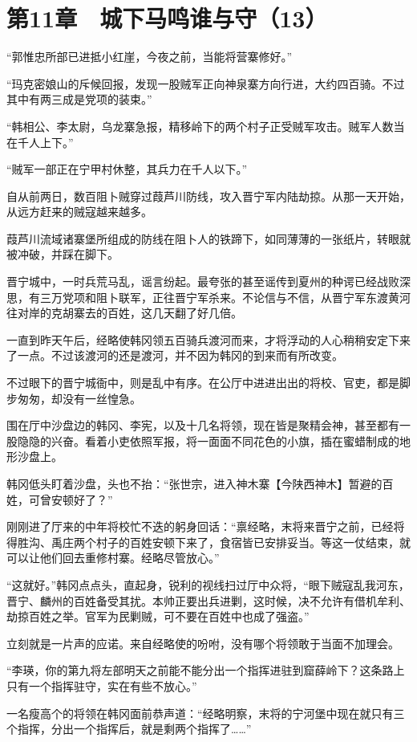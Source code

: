 \section{第11章　城下马鸣谁与守（13）}

“郭惟忠所部已进抵小红崖，今夜之前，当能将营寨修好。”

“玛克密娘山的斥候回报，发现一股贼军正向神泉寨方向行进，大约四百骑。不过其中有两三成是党项的装束。”

“韩相公、李太尉，乌龙寨急报，精移岭下的两个村子正受贼军攻击。贼军人数当在千人上下。”

“贼军一部正在宁甲村休整，其兵力在千人以下。”

自从前两日，数百阻卜贼穿过葭芦川防线，攻入晋宁军内陆劫掠。从那一天开始，从远方赶来的贼寇越来越多。

葭芦川流域诸寨堡所组成的防线在阻卜人的铁蹄下，如同薄薄的一张纸片，转眼就被冲破，并踩在脚下。

晋宁城中，一时兵荒马乱，谣言纷起。最夸张的甚至谣传到夏州的种谔已经战败深思，有三万党项和阻卜联军，正往晋宁军杀来。不论信与不信，从晋宁军东渡黄河往对岸的克胡寨去的百姓，这几天翻了好几倍。

一直到昨天午后，经略使韩冈领五百骑兵渡河而来，才将浮动的人心稍稍安定下来了一点。不过该渡河的还是渡河，并不因为韩冈的到来而有所改变。

不过眼下的晋宁城衙中，则是乱中有序。在公厅中进进出出的将校、官吏，都是脚步匆匆，却没有一丝惶急。

围在厅中沙盘边的韩冈、李宪，以及十几名将领，现在皆是聚精会神，甚至都有一股隐隐的兴奋。看着小吏依照军报，将一面面不同花色的小旗，插在蜜蜡制成的地形沙盘上。

韩冈低头盯着沙盘，头也不抬：“张世宗，进入神木寨【今陕西神木】暂避的百姓，可曾安顿好了？”

刚刚进了厅来的中年将校忙不迭的躬身回话：“禀经略，末将来晋宁之前，已经将得胜沟、禹庄两个村子的百姓安顿下来了，食宿皆已安排妥当。等这一仗结束，就可以让他们回去重修村寨。经略尽管放心。”

“这就好。”韩冈点点头，直起身，锐利的视线扫过厅中众将，“眼下贼寇乱我河东，晋宁、麟州的百姓备受其扰。本帅正要出兵进剿，这时候，决不允许有借机牟利、劫掠百姓之举。官军为民剿贼，可不要在百姓中也成了强盗。”

立刻就是一片声的应诺。来自经略使的吩咐，没有哪个将领敢于当面不加理会。

“李瑛，你的第九将左部明天之前能不能分出一个指挥进驻到窟薛岭下？这条路上只有一个指挥驻守，实在有些不放心。”

一名瘦高个的将领在韩冈面前恭声道：“经略明察，末将的宁河堡中现在就只有三个指挥，分出一个指挥后，就是剩两个指挥了……”

